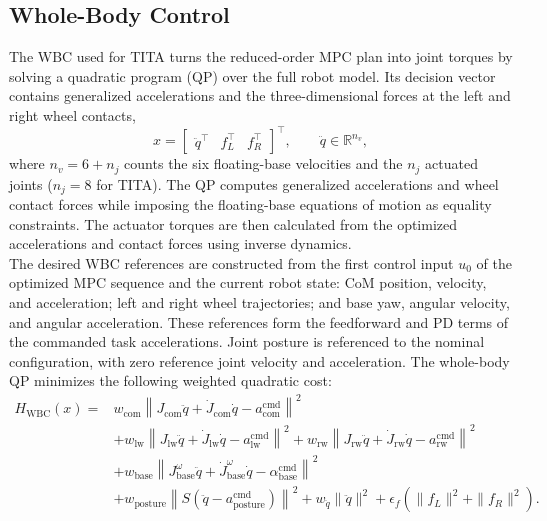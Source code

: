 \subsection{Whole-Body Control}
\label{subsec:wbc_dfcip}
The WBC used for TITA turns the reduced-order MPC plan into joint torques by
solving a quadratic program (QP) over the full robot model. Its decision vector
contains generalized accelerations and the three-dimensional forces at the
left and right wheel contacts,
\[
    x = \begin{bmatrix}
        \ddot{q}^{\top} & f_L^{\top} & f_R^{\top}
    \end{bmatrix}^{\top},
    \qquad \ddot{q}\in\mathbb{R}^{n_v},
\]
where $n_v=6+n_j$ counts the six floating-base velocities and the $n_j$
actuated joints ($n_j=8$ for TITA).
The QP computes generalized accelerations and wheel contact forces while
imposing the floating-base equations of motion as equality constraints. The
actuator torques are then calculated from the optimized accelerations and
contact forces using inverse dynamics.\\
The desired WBC references are constructed from the first control input
$u_0$ of the optimized MPC sequence and the current robot state:
CoM position, velocity, and acceleration; left and right wheel trajectories;
and base yaw, angular velocity, and angular acceleration. These references
form the feedforward and PD terms of the commanded task accelerations. Joint
posture is referenced to the nominal configuration, with zero reference joint
velocity and acceleration. The whole-body QP minimizes the following weighted
quadratic cost:
\begin{equation}
\begin{aligned}
H_{\mathrm{WBC}}(x) ={}&
    w_{\mathrm{com}}
    \left\|J_{\mathrm{com}}\ddot{q}
        +\dot{J}_{\mathrm{com}}\dot{q}
        -a_{\mathrm{com}}^{\mathrm{cmd}}\right\|^2
    \\
    &+w_{\mathrm{lw}}
    \left\|J_{\mathrm{lw}}\ddot{q}
        +\dot{J}_{\mathrm{lw}}\dot{q}
        -a_{\mathrm{lw}}^{\mathrm{cmd}}\right\|^2
    +w_{\mathrm{rw}}
    \left\|J_{\mathrm{rw}}\ddot{q}
        +\dot{J}_{\mathrm{rw}}\dot{q}
        -a_{\mathrm{rw}}^{\mathrm{cmd}}\right\|^2
    \\
    &+w_{\mathrm{base}}
    \left\|J_{\mathrm{base}}^{\omega}\ddot{q}
        +\dot{J}_{\mathrm{base}}^{\omega}\dot{q}
        -\alpha_{\mathrm{base}}^{\mathrm{cmd}}\right\|^2
    \\
    &+w_{\mathrm{posture}}
    \left\|S\left(\ddot{q}
    -a_{\mathrm{posture}}^{\mathrm{cmd}}\right)\right\|^2
    +w_{\ddot{q}}\|\ddot{q}\|^2
    +\epsilon_f
        \left(\|f_L\|^2+\|f_R\|^2\right).
\end{aligned}
\label{eq:tita_wbc_cost}
\end{equation}

